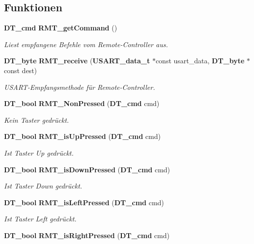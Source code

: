 \subsection*{Funktionen}
\begin{DoxyCompactItemize}
\item 
{\bf DT\_\-cmd} {\bf RMT\_\-getCommand} ()
\begin{DoxyCompactList}\small\item\em Liest empfangene Befehle vom Remote-\/Controller aus. \item\end{DoxyCompactList}\item 
{\bf DT\_\-byte} {\bf RMT\_\-receive} ({\bf USART\_\-data\_\-t} $\ast$const usart\_\-data, {\bf DT\_\-byte} $\ast$const dest)
\begin{DoxyCompactList}\small\item\em USART-\/Empfangsmethode für Remote-\/Controller. \item\end{DoxyCompactList}\item 
{\bf DT\_\-bool} {\bf RMT\_\-NonPressed} ({\bf DT\_\-cmd} cmd)
\begin{DoxyCompactList}\small\item\em Kein Taster gedrückt. \item\end{DoxyCompactList}\item 
{\bf DT\_\-bool} {\bf RMT\_\-isUpPressed} ({\bf DT\_\-cmd} cmd)
\begin{DoxyCompactList}\small\item\em Ist Taster Up gedrückt. \item\end{DoxyCompactList}\item 
{\bf DT\_\-bool} {\bf RMT\_\-isDownPressed} ({\bf DT\_\-cmd} cmd)
\begin{DoxyCompactList}\small\item\em Ist Taster Down gedrückt. \item\end{DoxyCompactList}\item 
{\bf DT\_\-bool} {\bf RMT\_\-isLeftPressed} ({\bf DT\_\-cmd} cmd)
\begin{DoxyCompactList}\small\item\em Ist Taster Left gedrückt. \item\end{DoxyCompactList}\item 
{\bf DT\_\-bool} {\bf RMT\_\-isRightPressed} ({\bf DT\_\-cmd} cmd)

\end{DoxyCompactItemize}

